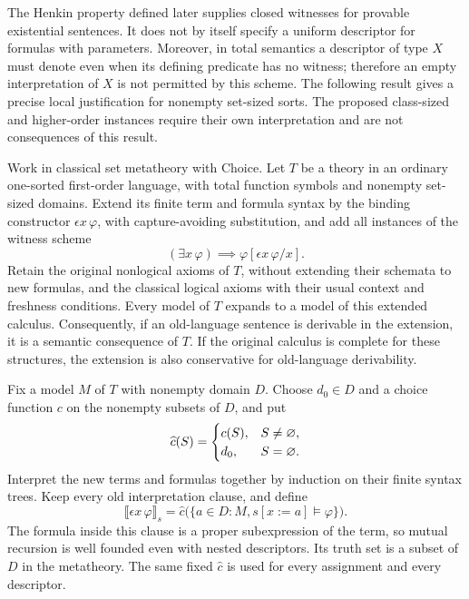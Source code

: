 The Henkin property defined later supplies closed witnesses for provable
existential sentences. It does not by itself specify a uniform descriptor
for formulas with parameters. Moreover, in total semantics a descriptor
of type $X$ must denote even when its defining predicate has no witness;
therefore an empty interpretation of $X$ is not permitted by this scheme.
The following result gives a precise local justification for nonempty
set-sized sorts. The proposed class-sized and higher-order instances
require their own interpretation and are not consequences of this result.

\begin{theorem}
\label{thm:total_witness_extension}
Work in classical set metatheory with Choice. Let $T$ be a theory in an
ordinary one-sorted first-order language, with total function symbols and
nonempty set-sized domains. Extend its finite term and formula syntax by
the binding constructor $\epsilon x\,\varphi$, with capture-avoiding
substitution, and add all instances of the witness scheme
\[
(\exists x\,\varphi)\implies\varphi[\epsilon x\,\varphi/x].
\]
Retain the original nonlogical axioms of $T$, without extending their
schemata to new formulas, and the classical logical axioms with their
usual context and freshness conditions. Every model of $T$ expands to a model of this extended
calculus. Consequently, if an old-language sentence is derivable in the
extension, it is a semantic consequence of $T$. If the original calculus
is complete for these structures, the extension is also conservative for
old-language derivability.
\end{theorem}
\Proof
Fix a model $M$ of $T$ with nonempty domain $D$. Choose $d_0\in D$
and a choice function $c$ on the nonempty subsets of $D$, and put
\[
\widehat c(S)=
\begin{cases}
c(S),&S\ne\varnothing,\\
d_0,&S=\varnothing.
\end{cases}
\]
Interpret the new terms and formulas together by induction on their
finite syntax trees. Keep every old interpretation clause, and define
\[
\llbracket\epsilon x\,\varphi\rrbracket_s
=\widehat c\bigl(\{a\in D:M,s[x:=a]\models\varphi\}\bigr).
\]
The formula inside this clause is a proper subexpression of the term,
so mutual recursion is well founded even with nested descriptors.
Its truth set is a subset of $D$ in the metatheory. The same fixed
$\widehat c$ is used for every assignment and every descriptor.

